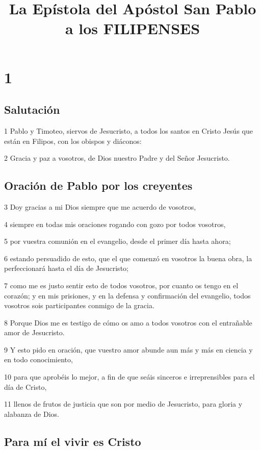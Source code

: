
\title{La Epístola del Apóstol San Pablo a los FILIPENSES}

\chapter{1}

\section*{Salutación}

\par 1 Pablo y Timoteo, siervos de Jesucristo, a todos los santos en Cristo Jesús que están en Filipos, con los obispos y diáconos:
\par 2 Gracia y paz a vosotros, de Dios nuestro Padre y del Señor Jesucristo.

\section*{Oración de Pablo por los creyentes}

\par 3 Doy gracias a mi Dios siempre que me acuerdo de vosotros,
\par 4 siempre en todas mis oraciones rogando con gozo por todos vosotros,
\par 5 por vuestra comunión en el evangelio, desde el primer día hasta ahora;
\par 6 estando persuadido de esto, que el que comenzó en vosotros la buena obra, la perfeccionará hasta el día de Jesucristo;
\par 7 como me es justo sentir esto de todos vosotros, por cuanto os tengo en el corazón; y en mis prisiones, y en la defensa y confirmación del evangelio, todos vosotros sois participantes conmigo de la gracia.
\par 8 Porque Dios me es testigo de cómo os amo a todos vosotros con el entrañable amor de Jesucristo.
\par 9 Y esto pido en oración, que vuestro amor abunde aun más y más en ciencia y en todo conocimiento,
\par 10 para que aprobéis lo mejor, a fin de que seáis sinceros e irreprensibles para el día de Cristo,
\par 11 llenos de frutos de justicia que son por medio de Jesucristo, para gloria y alabanza de Dios.

\section*{Para mí el vivir es Cristo}

